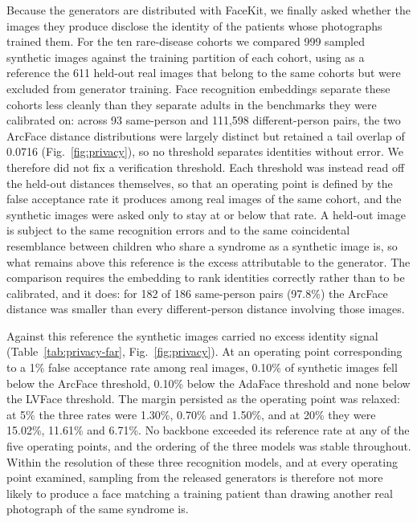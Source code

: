 Because the generators are distributed with FaceKit, we finally asked whether
the images they produce disclose the identity of the patients whose photographs
trained them. For the ten rare-disease cohorts we compared 999 sampled synthetic
images against the training partition of each cohort, using as a reference the
611 held-out real images that belong to the same cohorts but were excluded from
generator training. Face recognition embeddings separate these cohorts less
cleanly than they separate adults in the benchmarks they were calibrated on:
across 93 same-person and 111,598 different-person pairs, the two ArcFace
distance distributions were largely distinct but retained a tail overlap of
0.0716 (Fig.~\ref{fig:privacy}), so no threshold
separates identities without error. We therefore did not fix a verification
threshold. Each threshold was instead read off the held-out distances
themselves, so that an operating point is defined by the false acceptance rate
it produces among real images of the same cohort, and the synthetic images were
asked only to stay at or below that rate. A held-out image is subject to the
same recognition errors and to the same coincidental resemblance between
children who share a syndrome as a synthetic image is, so what remains above
this reference is the excess attributable to the generator. The comparison
requires the embedding to rank identities correctly rather than to be
calibrated, and it does: for 182 of 186 same-person pairs (97.8\%) the ArcFace
distance was smaller than every different-person distance involving those
images.

Against this reference the synthetic images carried no excess identity signal
(Table~\ref{tab:privacy-far},
Fig.~\ref{fig:privacy}). At an operating point
corresponding to a 1\% false acceptance rate among real images, 0.10\% of
synthetic images fell below the ArcFace threshold, 0.10\% below the AdaFace
threshold and none below the LVFace threshold. The margin persisted as the
operating point was relaxed: at 5\% the three rates were 1.30\%, 0.70\% and
1.50\%, and at 20\% they were 15.02\%, 11.61\% and 6.71\%. No backbone exceeded
its reference rate at any of the five operating points, and the ordering of the
three models was stable throughout. Within the resolution of these three
recognition models, and at every operating point examined, sampling from the
released generators is therefore not more likely to produce a face matching a
training patient than drawing another real photograph of the same syndrome is.

